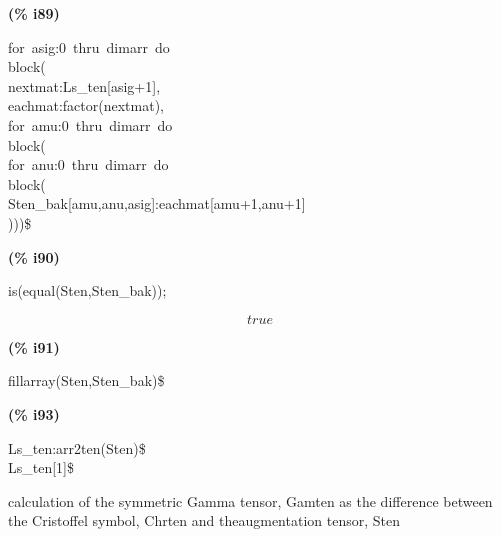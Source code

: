 \documentclass[fleqn]{article}
\begin{document}
\noindent%



\noindent
\begin{minipage}[t]{4.000000em}\color{red}\bfseries
(\% i89)	
\end{minipage}
\begin{minipage}[t]{\textwidth}\color{blue}
for\ asig:0\ thru\ dimarr\ do\\
block(\\
nextmat:Ls\_ten[asig+1],\\
eachmat:factor(nextmat),\\
for\ amu:0\ thru\ dimarr\ do\\
block(\\
for\ anu:0\ thru\ dimarr\ do\\
block(\\
Sten\_bak[amu,anu,asig]:eachmat[amu+1,anu+1]\\
)))\$
\end{minipage}

\noindent%



\noindent
\begin{minipage}[t]{4.000000em}\color{red}\bfseries
(\% i90)	
\end{minipage}
\begin{minipage}[t]{\textwidth}\color{blue}
is(equal(Sten,Sten\_bak));
\end{minipage}
\[\displaystyle \tag{\% o90} 
true\mbox{}
\]


\noindent
\begin{minipage}[t]{4.000000em}\color{red}\bfseries
(\% i91)	
\end{minipage}
\begin{minipage}[t]{\textwidth}\color{blue}
fillarray(Sten,Sten\_bak)\$
\end{minipage}

\noindent%



\noindent
\begin{minipage}[t]{4.000000em}\color{red}\bfseries
(\% i93)	
\end{minipage}
\begin{minipage}[t]{\textwidth}\color{blue}
Ls\_ten:arr2ten(Sten)\$\\
Ls\_ten[1]\$
\end{minipage}

\noindent%

calculation of the symmetric Gamma tensor, Gamten as the difference between the Cristoffel symbol, Chrten and theaugmentation tensor, Sten
\end{document}
